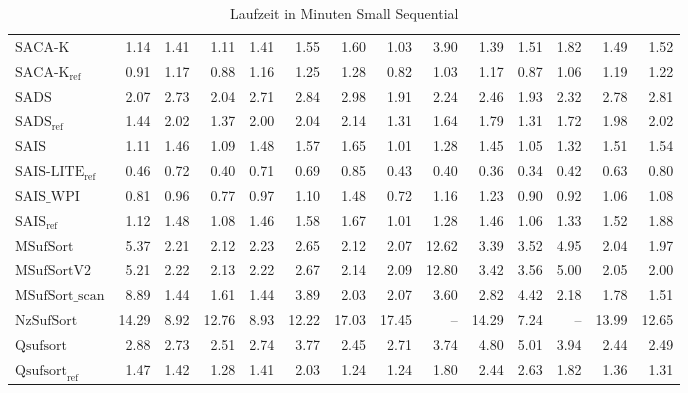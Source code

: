 \begin{table}[h]
{\begin{tabular}{lrrrrrrrrrrrrr}
    $\text{SACA-K}$ & 1.14 & 1.41 & 1.11 & 1.41 & 1.55 & 1.60 & 1.03 & 3.90 & 1.39 & 1.51 & 1.82 & 1.49 & 1.52 \\
    $\text{SACA-K}_{\text{ref}}$ & 0.91 & 1.17 & 0.88 & 1.16 & 1.25 & 1.28 & 0.82 & 1.03 & 1.17 & 0.87 & 1.06 & 1.19 & 1.22 \\
    $\text{SADS}$ & 2.07 & 2.73 & 2.04 & 2.71 & 2.84 & 2.98 & 1.91 & 2.24 & 2.46 & 1.93 & 2.32 & 2.78 & 2.81 \\
    $\text{SADS}_{\text{ref}}$ & 1.44 & 2.02 & 1.37 & 2.00 & 2.04 & 2.14 & 1.31 & 1.64 & 1.79 & 1.31 & 1.72 & 1.98 & 2.02 \\
    $\text{SAIS}$ & 1.11 & 1.46 & 1.09 & 1.48 & 1.57 & 1.65 & 1.01 & 1.28 & 1.45 & 1.05 & 1.32 & 1.51 & 1.54 \\
    $\text{SAIS-LITE}_{\text{ref}}$ & {\color{green!60!black}0.46} & 0.72 & {\color{green!60!black}0.40} & 0.71 & 0.69 & 0.85 & {\color{green!60!black}0.43} & {\color{green!60!black}0.40} & {\color{green!60!black}0.36} & {\color{green!60!black}0.34} & {\color{green!60!black}0.42} & 0.63 & 0.80 \\
    $\text{SAIS\_WPI}$ & 0.81 & 0.96 & 0.77 & 0.97 & 1.10 & 1.48 & 0.72 & 1.16 & 1.23 & 0.90 & 0.92 & 1.06 & 1.08 \\
    $\text{SAIS}_{\text{ref}}$ & 1.12 & 1.48 & 1.08 & 1.46 & 1.58 & 1.67 & 1.01 & 1.28 & 1.46 & 1.06 & 1.33 & 1.52 & 1.88 \\
    $\text{MSufSort}$ & 5.37 & 2.21 & 2.12 & 2.23 & 2.65 & 2.12 & 2.07 & {\color{red}12.62} & 3.39 & 3.52 & 4.95 & 2.04 & 1.97 \\
    $\text{MSufSortV2}$ & 5.21 & 2.22 & 2.13 & 2.22 & 2.67 & 2.14 & 2.09 & {\color{red}12.80} & 3.42 & 3.56 & 5.00 & 2.05 & 2.00 \\
    $\text{MSufSort\_scan}$ & 8.89 & 1.44 & 1.61 & 1.44 & 3.89 & 2.03 & 2.07 & 3.60 & 2.82 & 4.42 & 2.18 & 1.78 & 1.51 \\
    $\text{NzSufSort}$ & {\color{red}14.29} & {\color{red}8.92} & {\color{red}12.76} & {\color{red}8.93} & 12.22 & {\color{red}17.03} & {\color{red}17.45} & {\color{darkgray}--} & 14.29 & 7.24 & {\color{darkgray}--} & {\color{red}13.99} & {\color{red}12.65} \\
    $\text{Qsufsort}$ & 2.88 & 2.73 & 2.51 & 2.74 & 3.77 & 2.45 & 2.71 & 3.74 & 4.80 & 5.01 & 3.94 & 2.44 & 2.49 \\
    $\text{Qsufsort}_{\text{ref}}$ & 1.47 & 1.42 & 1.28 & 1.41 & 2.03 & 1.24 & 1.24 & 1.80 & 2.44 & 2.63 & 1.82 & 1.36 & 1.31 \\
\bottomrule
\end{tabular}
}
\caption{Laufzeit in Minuten Small Sequential}
\label{messung:tab:mem-small-seq-none}
\end{table}

